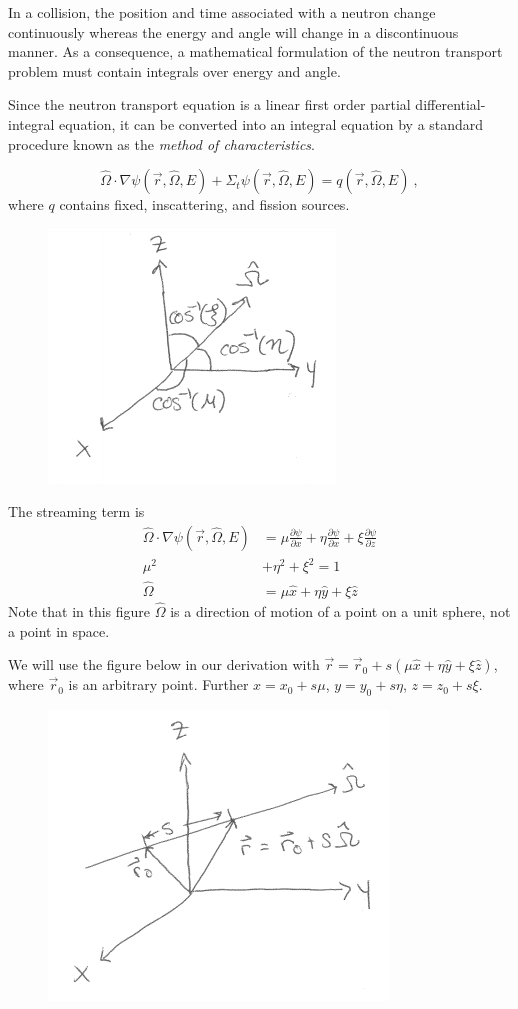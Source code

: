 \documentclass[12pt]{article}
\newcommand{\rvec}{\ensuremath{\vec{r}}}
\newcommand{\vOmega}{\ensuremath{\hat{\Omega}}}
\begin{document}
In a collision, the position
and time associated with a neutron change continuously whereas the energy and
angle will change in a discontinuous manner. As a consequence, a mathematical
formulation of the neutron transport problem must contain integrals over energy
and angle.

Since the neutron transport equation is a linear first order partial differential-
integral equation, it can be converted into an integral equation by a standard
procedure known as the \textit{method of characteristics}.

\[\vOmega \cdot \nabla \psi(\rvec, \vOmega, E) + \Sigma_t \psi(\rvec, \vOmega, E) = q(\rvec, \vOmega, E)\:,\]
where $q$ contains fixed, inscattering, and fission sources. \\

\begin{figure}[h!] 
    \label{fig:cosines}
    \begin{center}
    \includegraphics[keepaspectratio, width = 2 in]{../figs/cosines}
    \end{center}    
\end{figure}
%
The streaming term is 
\begin{align*}
\vOmega \cdot \nabla \psi(\rvec, \vOmega, E) &= \mu \frac{\partial \psi}{\partial x} + \eta \frac{\partial \psi}{\partial x} + \xi \frac{\partial \psi}{\partial z} \\
\mu^2 &+ \eta^2 + \xi^2 = 1 \\
\vOmega &= \mu \hat{x} + \eta \hat{y} + \xi \hat{z}
\end{align*}
%
Note that in this figure $\vOmega$ is a direction of motion of a point on a unit sphere, not a point in space.

We will use the figure below in our derivation with $\vec{r} = \rvec_0 + s(\mu \hat{x} + \eta \hat{y} + \xi \hat{z})$, where $\rvec_0$ is an arbitrary point.
Further $x = x_0 + s\mu$, $y = y_0 + s\eta$, $z = z_0 + s\xi$.
%
\begin{figure}[h!] 
    \begin{center}
    \includegraphics[keepaspectratio, width = 2.5 in]{../figs/moc-stream}    
    \end{center}
    \label{fig:stream}   
\end{figure}
\end{document}
